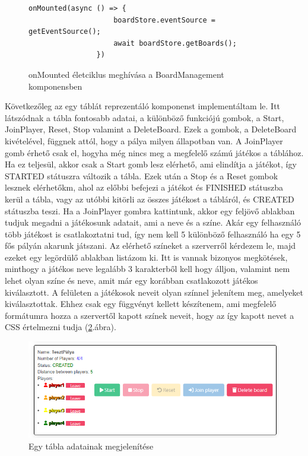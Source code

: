 \documentclass[a4paper,twoside]{article}
\begin{document}
\begin{figure}
	\caption{onMounted életciklus meghívása a BoardManagement komponensben}
	
		\begin{minipage}{\textwidth}
			\begin{lstlisting}[style=javascriptStyle]
				onMounted(async () => {
					boardStore.eventSource = getEventSource();
					await boardStore.getBoards();
				})
			\end{lstlisting}
		\end{minipage}
	
	\label{onMounted}
\end{figure}
\FloatBarrier

Következőleg az egy táblát reprezentáló komponenst implementáltam le. Itt látszódnak a tábla
fontosabb adatai, a különböző funkciójú gombok, a Start, JoinPlayer, Reset, Stop valamint a DeleteBoard. Ezek a gombok, a DeleteBoard kivételével, függnek attól, hogy a pálya milyen állapotban van. A JoinPlayer gomb érhető csak el, hogyha még nincs meg a megfelelő számú játékos a táblához. Ha ez teljesül, akkor csak a Start gomb lesz elérhető, ami elindítja a játékot, így STARTED státuszra változik a tábla. Ezek után a Stop és a Reset gombok lesznek elérhetőkm, ahol az előbbi befejezi a játékot és FINISHED státuszba kerül a tábla, vagy az utóbbi kitörli az összes játékost a tábláról, és CREATED státuszba teszi. Ha a JoinPlayer gombra kattintunk, akkor egy feljövő ablakban tudjuk megadni a játékosunk adatait, ami a neve és a színe. Akár egy felhasználó több játékost is csatlakoztatni tud, így nem kell 5 különböző felhasználó ha egy 5 fős pályán akarunk játszani. Az elérhető színeket a szerverről kérdezem le, majd ezeket egy legördülő ablakban listázom ki. Itt is vannak bizonyos megkötések, minthogy a játékos neve legalább 3 karakterből kell hogy álljon, valamint nem lehet olyan színe és neve, amit már egy korábban csatlakozott játékos kiválasztott. A felületen a játékosok neveit olyan színnel jelenítem meg, amelyeket kiválasztottak. Ehhez csak egy függvényt kellett készítenem, ami megfelelő formátumra hozza a szervertől kapott színek neveit, hogy az így kapott nevet a CSS értelmezni tudja (\ref{board}.ábra). 

\begin{figure}
	\caption{Egy tábla adatainak megjelenítése}
	\label{board}
	\centering
	\includegraphics[scale=0.63]{board}
\end{figure}
\end{document}

